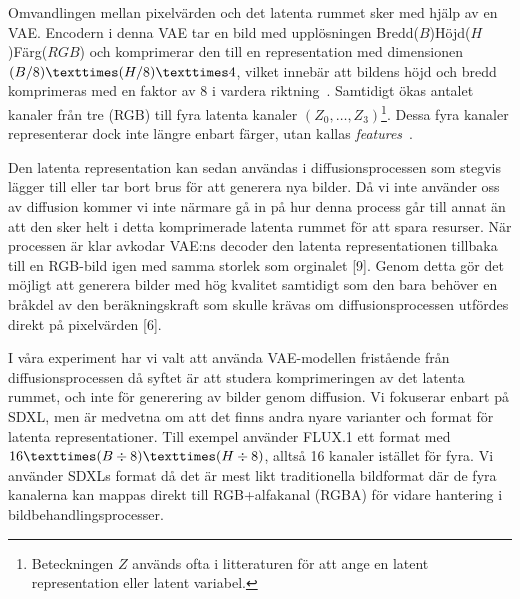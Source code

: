 Omvandlingen mellan pixelvärden och det latenta rummet sker med hjälp av en VAE. Encodern i denna VAE tar en bild med upplösningen Bredd($B$)\texttimes Höjd($H$)\texttimes Färg($RGB$) och komprimerar den till en representation med dimensionen $(B/8) \texttimes (H/8) \texttimes 4$, vilket innebär att bildens höjd och bredd komprimeras med en faktor av 8 i vardera riktning~\cite{podell2024sdxl}. Samtidigt ökas antalet kanaler från tre (RGB) till fyra latenta kanaler $(Z_0,\dots,Z_3)$\footnote{Beteckningen $Z$ används ofta i litteraturen för att ange en latent representation eller latent variabel.}. Dessa fyra kanaler representerar dock inte längre enbart färger, utan kallas \textit{features}~\cite{podell2024sdxl}.

Den latenta representation kan sedan användas i diffusionsprocessen som stegvis lägger till eller tar bort brus för att generera nya bilder. Då vi inte använder oss av diffusion kommer vi inte närmare gå in på hur denna process går till annat än att den sker helt i detta komprimerade latenta rummet för att spara resurser. När processen är klar avkodar VAE:ns decoder den latenta representationen tillbaka till en RGB-bild igen med samma storlek som orginalet [9]. Genom detta gör det möjligt att generera bilder med hög kvalitet samtidigt som den bara behöver en bråkdel av den beräkningskraft som skulle krävas om diffusionsprocessen utfördes direkt på pixelvärden [6].


I våra experiment har vi valt att använda VAE-modellen fristående från diffusionsprocessen då syftet är att studera komprimeringen av det latenta rummet, och inte för generering av bilder genom diffusion. Vi fokuserar enbart på SDXL, men är medvetna om att det finns andra nyare varianter och format för latenta representationer. Till exempel använder FLUX.1 ett format med $16\texttimes(B\div8) \texttimes (H\div8)$, alltså 16 kanaler istället för fyra.  Vi använder SDXLs format då det är mest likt traditionella bildformat där de fyra kanalerna kan mappas direkt till RGB+alfakanal (RGBA) för vidare hantering i bildbehandlingsprocesser.

